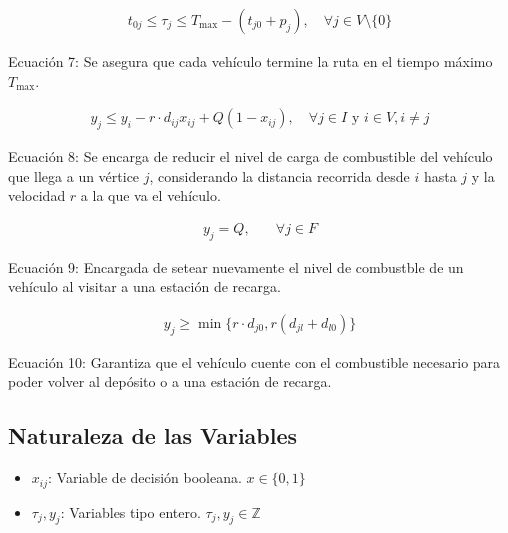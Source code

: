 \documentclass[letter, 10pt]{article}
\begin{document}
\begin{align}
    t_{0j} \leq \tau_j \leq T_{\text{max}} - (t_{j0} + p_j), \quad \forall j \in V \text{\textbackslash}\{0\}
\end{align}

\begin{center}
    Ecuación 7: Se asegura que cada vehículo termine la ruta en el tiempo máximo $T_{\text{max}}$.
\end{center}

\begin{align}
    y_j \leq y_i - r \cdot d_{ij}x_{ij} + Q(1 - x_{ij}), \quad \forall j \in I \text{ y } i \in V, i \neq j
\end{align}

\begin{center}
    Ecuación 8: Se encarga de reducir el nivel de carga de combustible del vehículo que llega a un vértice $j$, considerando la distancia recorrida desde $i$ hasta $j$ y la velocidad $r$ a la que va el vehículo.
\end{center}

\begin{align}
    y_j = Q, & \quad \forall j \in F
\end{align}

\begin{center}
    Ecuación 9: Encargada de setear nuevamente el nivel de combustble de un vehículo al visitar a una estación de recarga.
\end{center}

\begin{align}
    y_j \geq \min \{r \cdot d_{j0}, r(d_{jl} + d_{l0})\}
\end{align}

\begin{center}
    Ecuación 10: Garantiza que el vehículo cuente con el combustible necesario para poder volver al depósito o a una estación de recarga.
\end{center}

\subsection{Naturaleza de las Variables}
\begin{itemize}
    \item $x_{ij}$: Variable de decisión booleana. $x \in \{0,1\}$
    \item $\tau_j, y_j$: Variables tipo entero. $\tau_j, y_j \in \mathbb{Z}$
\end{itemize}
\end{document}
